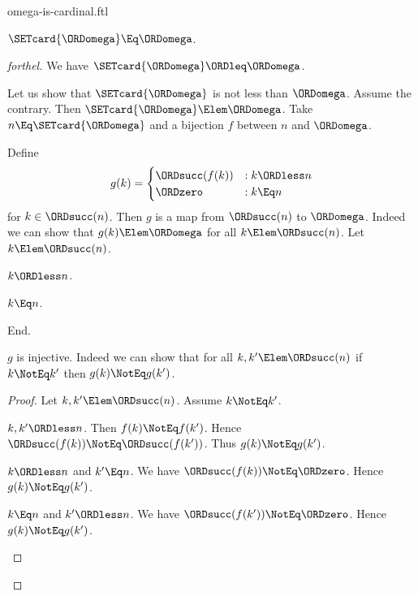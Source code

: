 \documentclass{stex}
\begin{document}
\begin{smodule}{omega-is-cardinal.ftl}

\begin{proposition}[forthel]
  $\SETcard{\ORDomega} \Eq \ORDomega$.
\end{proposition}
\begin{proof}[forthel]
  We have $\SETcard{\ORDomega} \ORDleq \ORDomega$.

  Let us show that $\SETcard{\ORDomega}$ is not less than $\ORDomega$.
    Assume the contrary.
    Then $\SETcard{\ORDomega} \Elem \ORDomega$.
    Take $n \Eq \SETcard{\ORDomega}$ and a bijection $f$ between $n$ and $\ORDomega$.

    Define \[ g(k) =
      \begin{cases}
        \ORDsucc(f(k)) & : k \ORDless n
        \\
        \ORDzero           & : k \Eq n
      \end{cases} \]
    for $k \in \ORDsucc(n)$.
    Then $g$ is a map from $\ORDsucc(n)$ to $\ORDomega$.
    Indeed we can show that $g(k) \Elem \ORDomega$ for all $k \Elem \ORDsucc(n)$.
      Let $k \Elem \ORDsucc(n)$.
      \begin{case}{$k \ORDless n$.} \end{case}
      \begin{case}{$k \Eq n$.} \end{case}
    End.

    $g$ is injective.
    Indeed we can show that for all $k, k' \Elem \ORDsucc(n)$ if $k \NotEq k'$
    then $g(k) \NotEq g(k')$. 
    \begin{proof}
      Let $k, k' \Elem \ORDsucc(n)$.
      Assume $k \NotEq k'$.

      \begin{case}{$k, k' \ORDless n$.}
        Then $f(k) \NotEq f(k')$.
        Hence $\ORDsucc(f(k)) \NotEq \ORDsucc(f(k'))$.
        Thus $g(k) \NotEq g(k')$.
      \end{case}

      \begin{case}{$k \ORDless n$ and $k' \Eq n$.}
        We have $\ORDsucc(f(k)) \NotEq \ORDzero$.
        Hence $g(k) \NotEq g(k')$.
      \end{case}

      \begin{case}{$k \Eq n$ and $k' \ORDless n$.}
        We have $\ORDsucc(f(k')) \NotEq \ORDzero$.
        Hence $g(k) \NotEq g(k')$.
      \end{case}
    \end{proof}


\end{proof}
\end{smodule}
\end{document}
